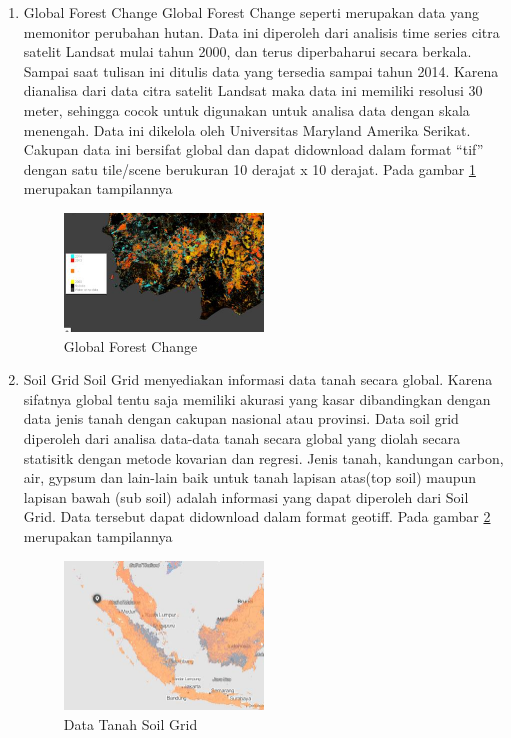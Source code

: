 \begin{enumerate}
\item Global Forest Change
Global Forest Change seperti merupakan data yang memonitor perubahan hutan. Data ini diperoleh dari analisis time series citra satelit Landsat mulai tahun 2000, dan terus diperbaharui secara berkala.  Sampai saat tulisan ini ditulis data yang tersedia sampai tahun 2014. Karena dianalisa dari data citra satelit Landsat maka data ini memiliki resolusi 30 meter, sehingga cocok untuk digunakan untuk analisa data dengan skala menengah. Data ini dikelola oleh Universitas Maryland Amerika Serikat. Cakupan data ini bersifat global dan dapat didownload dalam format “tif” dengan satu tile/scene berukuran 10 derajat x 10 derajat. Pada gambar \ref{labelgambar4} merupakan tampilannya
\begin{figure}[ht]
\centering
\includegraphics[width=0.5\textwidth]{pictures/Global_Forest_Change}
\caption{Global Forest Change}
\label{labelgambar4}
\end{figure}

\item Soil Grid
Soil Grid menyediakan informasi data tanah secara global. Karena sifatnya global tentu saja memiliki akurasi yang kasar dibandingkan dengan data jenis tanah dengan cakupan nasional atau provinsi. Data soil grid diperoleh dari analisa data-data tanah secara global yang diolah secara statisitk dengan metode kovarian dan regresi. Jenis tanah, kandungan carbon, air, gypsum dan lain-lain baik untuk tanah lapisan atas(top soil) maupun lapisan bawah (sub soil) adalah informasi yang dapat diperoleh dari Soil Grid. Data tersebut dapat didownload dalam format geotiff.  Pada gambar \ref{labelgambar5} merupakan tampilannya  

\begin{figure}[ht]
\centering
\includegraphics[width=0.5\textwidth]{pictures/Data_Tanah_Soil_Grid}
\caption{Data Tanah Soil Grid}
\label{labelgambar5}
\end{figure}


\end{enumerate}
